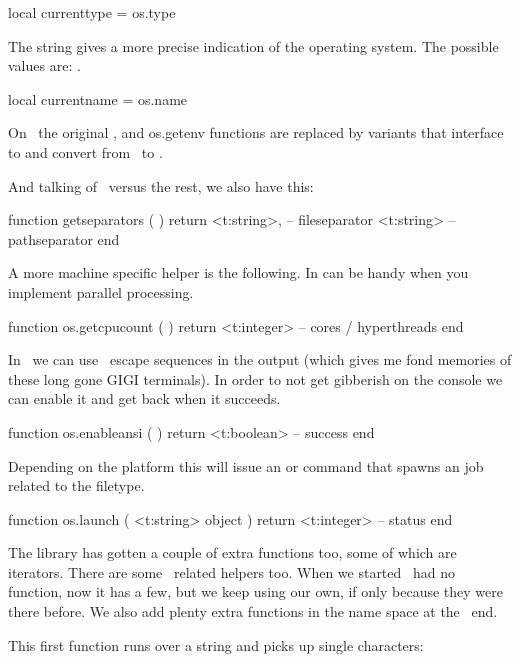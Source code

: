 \starttyping[option=LUA]
local currenttype = os.type
\stoptyping

The  string gives a more precise indication of the operating
system. The possible values are: .

\starttyping[option=LUA]
local currentname = os.name
\stoptyping

On \MSWINDOWS\ the original ,  and \type
{os.getenv} functions are replaced by variants that interface to and convert from
\ to .

And talking of \MSWINDOWS\ versus the rest, we also have this:

\starttyping[option=LUA]
function getseparators ( )
    return
        <t:string>, -- fileseparator
        <t:string>  -- pathseparator
end
\stoptyping

A more machine specific helper is the following. In can be handy when you
implement parallel processing.

\starttyping[option=LUA]
function os.getcpucount ( )
    return <t:integer> -- cores / hyperthreads
end
\stoptyping

In \CONTEXT\ we can use \ANSI\ escape sequences in the output (which gives me
fond memories of these long gone GIGI terminals). In order to not get gibberish
on the console we can enable it and get  back when it succeeds.

\starttyping[option=LUA]
function os.enableansi ( )
    return <t:boolean> -- success
end
\stoptyping

Depending on the platform this will issue an  or 
command that spawns an job related to the filetype.

\starttyping[option=LUA]
function os.launch ( <t:string> object )
    return <t:integer> -- status
end
\stoptyping

\stopsubsection

\startsubsection[title=Extra string helpers]

The  library has gotten a couple of extra functions too, some of
which are iterators. There are some \UNICODE\ related helpers too. When we
started \LUA\ had no  function, now it has a few, but we keep using our own,
if only because they were there before. We also add plenty extra functions in the
 name space at the \LUA\ end.

This first function runs over a string and picks up single characters:

